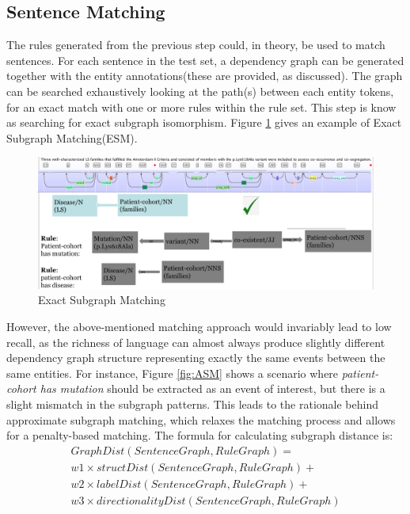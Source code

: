 \subsection{Sentence Matching}
The rules generated from the previous step could, in theory, be used to match sentences. For each sentence in the test set, a dependency graph can be generated together with the entity annotations(these are provided, as discussed). The graph can be searched exhaustively looking at the path(s) between each entity tokens, for an exact match with one or more rules within the rule set. This step is know as searching for exact subgraph isomorphism. Figure \ref{fig:ESM} gives an example of Exact Subgraph Matching(ESM).\newline\newline
\begin{figure}[h]
	\centering
	\includegraphics[width=\textwidth]{ESM}
	\caption{Exact Subgraph Matching}
	\label{fig:ESM}   
\end{figure}
However, the above-mentioned matching approach would invariably lead to low recall, as the richness of language can almost always produce slightly different dependency graph structure representing exactly the same events between the same entities. For instance, Figure \ref{fig:ASM} shows a scenario where \emph{patient-cohort has mutation} should be extracted as an event of interest, but there is a slight mismatch in the subgraph patterns. This leads to the rationale behind approximate subgraph matching, which relaxes the matching process and allows for a penalty-based matching. The formula for calculating subgraph distance is: 
\begin{equation}
\begin{split}
GraphDist(SentenceGraph, RuleGraph) = \\
w1 \times structDist(SentenceGraph, RuleGraph)  +\\ 
w2 \times labelDist(SentenceGraph, RuleGraph)   +\\
w3 \times directionalityDist(SentenceGraph, RuleGraph)\\
\end{split}
\end{equation}
